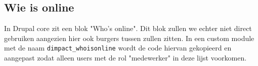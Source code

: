 \subsection{Wie is online}\label{wieisonline}

In Drupal core zit een blok "Who's online". Dit blok zullen we echter niet direct gebruiken aangezien hier ook burgers tussen zullen zitten. In een custom module met de naam \texttt{dimpact\_whoisonline} wordt de code hiervan gekopieerd en aangepast zodat alleen users met de rol "medewerker" in deze lijst voorkomen.
